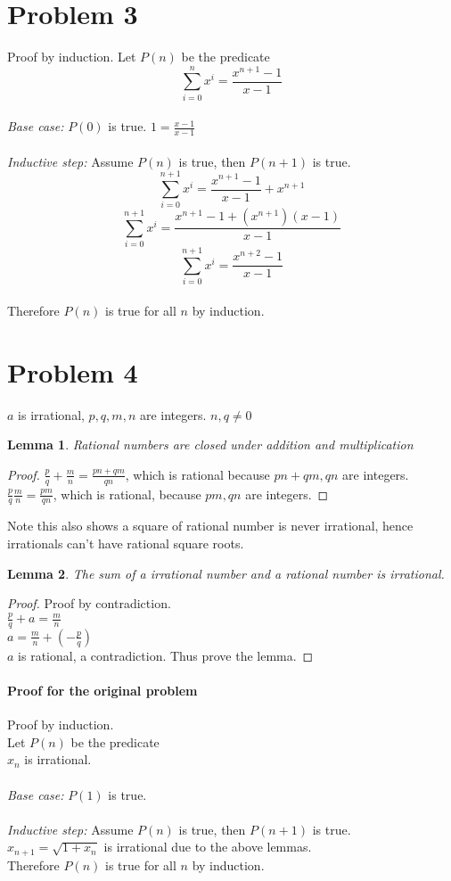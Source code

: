 \documentclass[letter]{article}
\begin{document}
\section*{Problem 3}

Proof by induction.
Let $P(n)$ be the predicate\\
\[
\sum_{i=0}^{n}x^i=\frac{x^{n+1}-1}{x-1}
\]
 \\
\emph{Base case:} $P(0)$ is true. $1 = \frac{x-1}{x-1}$\\
 \\
\emph{Inductive step:} Assume $P(n)$ is true, then $P(n+1)$ is true.\\
\[
\sum_{i=0}^{n+1}x^i=\frac{x^{n+1}-1}{x-1}+x^{n+1}
\]
\[
\sum_{i=0}^{n+1}x^i=\frac{x^{n+1}-1+(x^{n+1})(x-1)}{x-1}
\]
\[
\sum_{i=0}^{n+1}x^i=\frac{x^{n+2}-1}{x-1}
\]
 \\
Therefore $P(n)$ is true for all $n$ by induction.

\section*{Problem 4}
$a$ is irrational, $p,q,m,n$ are integers. $n,q\neq 0$
\newtheorem{lma}{Lemma}
\begin{lma}
Rational numbers are closed under addition and multiplication
\end{lma}
\begin{proof}
$\frac{p}{q} + \frac{m}{n} = \frac{pn+qm}{qn}$, which is rational because $pn+qm, qn$ are integers.\\
$\frac{p}{q} \frac{m}{n} = \frac{pm}{qn}$, which is rational, because $pm, qn$ are integers.
\end{proof}
Note this also shows a square of rational number is never irrational, hence irrationals can't have rational square roots.
\begin{lma}
The sum of a irrational number and a rational number is irrational.
\end{lma}
\begin{proof}
Proof by contradiction.\\
$\frac{p}{q} + a = \frac{m}{n}$\\
$a = \frac{m}{n} + (- \frac{p}{q})$\\
$a$ is rational, a contradiction. Thus prove the lemma.
\end{proof}

\paragraph{Proof for the original problem}
Proof by induction.\\
Let $P(n)$ be the predicate\\
$x_n$ is irrational.\\
 \\
\emph{Base case:} $P(1)$ is true.\\
 \\
\emph{Inductive step:} Assume $P(n)$ is true, then $P(n+1)$ is true.\\
$x_{n+1} = \sqrt{1+x_n}$ is irrational due to the above lemmas.\\
Therefore $P(n)$ is true for all $n$ by induction.
\end{document}
